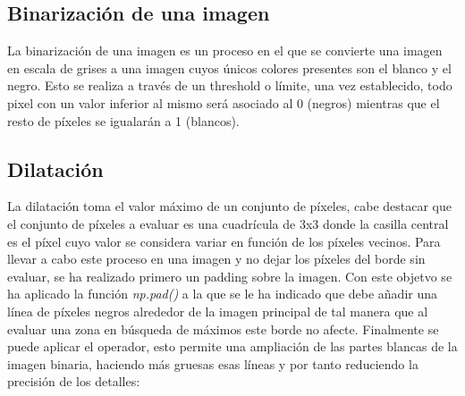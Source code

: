 \documentclass[a4paper,12pt]{article}
\begin{document}
{\vspace{0.5cm}

\subsection{Binarización de una imagen}

\vspace{0.5cm}

La binarización de una imagen es un proceso en el que se convierte una imagen en escala de grises a una imagen cuyos únicos colores presentes son el blanco y el negro. Esto se realiza a través
de un threshold o límite, una vez establecido, todo pixel con un valor inferior al mismo será asociado al 0 (negros) mientras que el resto de píxeles se igualarán a 1 (blancos).

\vspace{0.5cm}

\subsection{Dilatación}

\vspace{0.5cm}

La dilatación toma el valor máximo de un conjunto de píxeles, cabe destacar que el conjunto de píxeles a evaluar es una cuadrícula de 3x3 donde la casilla central es el píxel cuyo valor se 
considera variar en función de los píxeles vecinos. Para llevar a cabo este proceso en una imagen y no dejar los píxeles del borde sin evaluar, se ha realizado primero un padding sobre la imagen.
Con este objetvo se ha aplicado la función \textit{np.pad()} a la que se le ha indicado que debe añadir una línea de píxeles negros alrededor de la imagen principal de tal manera que al evaluar 
una zona en búsqueda de máximos este borde no afecte. Finalmente se puede aplicar el operador, esto permite una ampliación de las partes blancas de la imagen binaria, haciendo más gruesas esas líneas
y por tanto reduciendo la precisión de los detalles:

\vspace{0.5cm}

}
\end{document}

